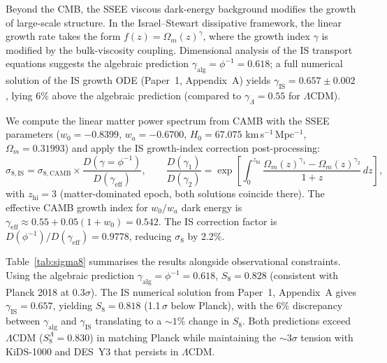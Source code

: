\documentclass[12pt,a4paper]{article}
\begin{document}
Beyond the CMB, the SSEE viscous dark-energy background modifies the growth
of large-scale structure. In the Israel--Stewart dissipative framework, the
linear growth rate takes the form $f(z) = \Omega_m(z)^\gamma$, where the
growth index $\gamma$ is modified by the bulk-viscosity coupling.
Dimensional analysis of the IS transport equations suggests the algebraic
prediction $\gamma_\mathrm{alg} = \phi^{-1} = 0.618$; a full numerical
solution of the IS growth ODE (Paper~1, Appendix~A) yields
$\gamma_{\mathrm{IS}} = 0.657\pm0.002$, lying 6\% above the algebraic
prediction (compared to $\gamma_\Lambda=0.55$ for $\Lambda$CDM).

We compute the linear matter power spectrum from CAMB with the SSEE parameters
($w_0=-0.8399$, $w_a=-0.6700$, $H_0=67.075$ km\,s$^{-1}$\,Mpc$^{-1}$,
$\Omega_m=0.31993$) and apply the IS growth-index correction post-processing:
\begin{equation}
  \sigma_{8,\mathrm{IS}} = \sigma_{8,\mathrm{CAMB}} \times
    \frac{D(\gamma=\phi^{-1})}{D(\gamma_\mathrm{eff})} ,
  \qquad
  \frac{D(\gamma_1)}{D(\gamma_2)} = \exp\!\left[
    \int_0^{z_\mathrm{hi}} \frac{\Omega_m(z)^{\gamma_1} - \Omega_m(z)^{\gamma_2}}{1+z}\,dz
  \right] ,
\end{equation}
with $z_\mathrm{hi}=3$ (matter-dominated epoch, both solutions coincide there).
The effective CAMB growth index for $w_0/w_a$ dark energy is
$\gamma_\mathrm{eff} \approx 0.55 + 0.05(1+w_0) = 0.542$.
The IS correction factor is $D(\phi^{-1})/D(\gamma_\mathrm{eff}) = 0.9778$,
reducing $\sigma_8$ by 2.2\%.

Table~\ref{tab:sigma8} summarises the results alongside observational constraints.
Using the algebraic prediction $\gamma_\mathrm{alg}=\phi^{-1}=0.618$,
$S_8=0.828$ (consistent with Planck 2018 at $0.3\sigma$).
The IS numerical solution from Paper~1, Appendix~A gives
$\gamma_\mathrm{IS}=0.657$, yielding $S_8=0.818$ (1.1\,$\sigma$ below Planck),
with the 6\% discrepancy between $\gamma_\mathrm{alg}$ and $\gamma_\mathrm{IS}$
translating to a $\sim 1\%$ change in $S_8$.
Both predictions exceed $\Lambda$CDM ($S_8^\Lambda=0.830$) in matching Planck
while maintaining the $\sim 3\sigma$ tension with KiDS-1000 and DES~Y3 that
persists in $\Lambda$CDM.
\end{document}
